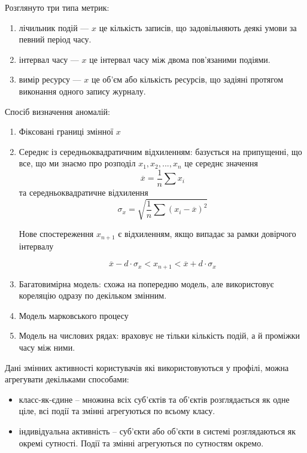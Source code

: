 Розглянуто три типа метрик:

\begin{enumerate}
  \item лічильник подій --- $x$ це кількість записів, що 
        задовільняють деякі умови за певний період часу.
  \item інтервал часу --- $x$ це інтервал часу між двома 
        пов'язаними подіями.
  \item вимір ресурсу --- $x$ це об'єм або кількість ресурсів,
        що задіяні протягом виконання одного запису журналу.
\end{enumerate}

Спосіб визначення аномалій:

\begin{enumerate}
  \item Фіксовані границі змінної $x$
  \item Середнє із середньоквадратичним відхиленням: базується на
        припущенні, що все, що ми знаємо про розподіл
        $x_1, x_2, ..., x_n$ це середнє значення
        \begin{equation}
            \overline{x} = \frac{1}{n} \sum{x_i}
        \end{equation}
        та середньоквадратичне відхилення
        \begin{equation}
            \sigma_x = \sqrt{\frac{1}{n} \sum{(x_i - \overline{x})^2}}
        \end{equation}

        Нове спостереження $x_{n+1}$ є відхиленням, якщо випадає за рамки довірчого інтервалу

        \begin{equation}
            \overline{x} - d \cdot \sigma_x < x_{n+1} < \overline{x} + d \cdot \sigma_x
        \end{equation}

    \item Багатовимірна модель: схожа на попередню модель, але
          використовує кореляцію одразу по декільком змінним.
    \item Модель марковського процесу
    \item Модель на числових рядах: враховує не тільки кількість
          подій, а й проміжки часу між ними.
\end{enumerate}

Дані змінних активності користувачів які використовуються
у профілі, можна агрегувати декільками способами: %

\begin{itemize}
  \item класс-як-єдине -- множина всіх суб'єктів та об'єктів
        розглядається як одне ціле, всі події та змінні
        агрегуються по всьому класу.
  \item індивідуальна активність -- суб'єкти або об'єкти в 
        системі розглядаються як окремі сутності. Події та змінні агрегуються по сутностям окремо.
\end{itemize}

